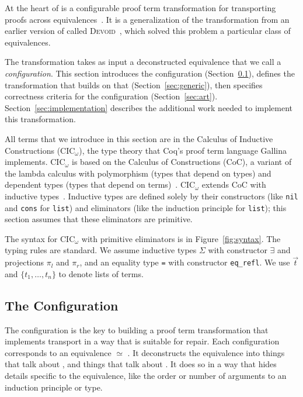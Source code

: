 At the heart of \toolnamec is a configurable proof term transformation for transporting
proofs across equivalences~\href{https://github.com/uwplse/pumpkin-pi/blob/v2.0.0/plugin/src/automation/lift/lift.ml}{}.
It is a generalization of the transformation from an earlier version of \toolnamec called
\textsc{Devoid}~\cite{Ringer2019}, which solved this problem a particular class of equivalences.

The transformation takes as input a deconstructed equivalence that we call a \textit{configuration}.
This section introduces the configuration (Section~\ref{sec:configurable}),
defines the transformation that builds on that (Section~\ref{sec:generic}),
then specifies correctness criteria for the configuration (Section~\ref{sec:art}).
Section~\ref{sec:implementation} describes the additional work needed to implement this transformation.

All terms that we introduce in this section are in the Calculus of Inductive Constructions (CIC$_{\omega}$), the type theory
that Coq's proof term language Gallina implements.
CIC$_{\omega}$ is based on the Calculus of Constructions (CoC), a variant of the lambda calculus with polymorphism (types that depend on types) and dependent types (types that depend on terms)~\cite{coquand:inria-00076024}. CIC$_{\omega}$ extends CoC with
inductive types~\cite{inductive}.
Inductive types are defined solely by their constructors (like \lstinline{nil} and \lstinline{cons} for \lstinline{list}) and eliminators (like the induction principle for \lstinline{list}); this section assumes that these eliminators are primitive.

The syntax for CIC$_{\omega}$ with primitive eliminators is in Figure~\ref{fig:syntax}.
The typing rules are standard.
We assume inductive types $\Sigma$ with constructor $\exists$ and projections $\pi_l$ and $\pi_r$,
and an equality type \lstinline{=} with constructor \lstinline{eq_refl}.
We use $\vec{t}$ and $\{t_1, \ldots, t_n\}$ to denote lists of terms.

\subsection{The Configuration}
\label{sec:configurable}

The configuration is the key to building a proof term transformation that implements transport in a way that is suitable for repair.
Each configuration corresponds to an equivalence \Aa $\simeq$ \B.
It deconstructs the equivalence into things that talk about \Aa, and things that talk about \B.
It does so in a way that hides details
specific to the equivalence, like the order or number of arguments to an induction principle or type.

